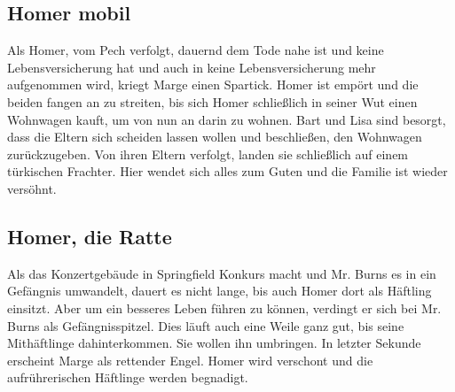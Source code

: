 \subsection{Homer mobil}\label{GABF07}
Als Homer, vom Pech verfolgt, dauernd dem Tode nahe ist und keine Lebensversicherung hat und auch in keine Lebensversicherung mehr aufgenommen wird, kriegt Marge einen Spartick. Homer ist empört und die beiden fangen an zu streiten, bis sich Homer schließlich in seiner Wut einen Wohnwagen kauft, um von nun an darin zu wohnen. Bart und Lisa sind besorgt, dass die Eltern sich scheiden lassen wollen und beschließen, den Wohnwagen zurückzugeben. Von ihren Eltern verfolgt, landen sie schließlich auf einem türkischen Frachter. Hier wendet sich alles zum Guten und die Familie ist wieder versöhnt.


\subsection{Homer, die Ratte}\label{GABF08}
Als das Konzertgebäude in Springfield Konkurs macht und Mr. Burns es in ein Gefängnis umwandelt, dauert es nicht lange, bis auch Homer dort als Häftling einsitzt. Aber um ein besseres Leben führen zu können, verdingt er sich bei Mr. Burns als Gefängnisspitzel. Dies läuft auch eine Weile ganz gut, bis seine Mithäftlinge dahinterkommen. Sie wollen ihn umbringen. In letzter Sekunde erscheint Marge als rettender Engel. Homer wird verschont und die auf\-rühr\-er\-isch\-en Häftlinge werden begnadigt.

